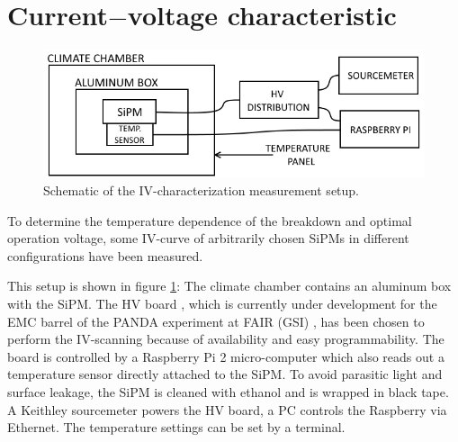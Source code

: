 \section{Current$-$voltage characteristic}
\begin{figure}[b]
	\centering
	\includegraphics[width=0.85\linewidth]{./graphics/ch4/scheme_iv_curves.png}
	\caption{Schematic of the IV-characterization measurement setup.}
	\label{fig:ch4:iv_scheme}
\end{figure}
To determine the temperature dependence of the breakdown and optimal operation voltage, some IV-curve of arbitrarily chosen SiPMs in different configurations have been measured.  \par 
This setup is shown in figure \ref{fig:ch4:iv_scheme}: The climate chamber contains an aluminum box with the SiPM. The HV board \cite{chris}, which is currently under development for the EMC barrel of the PANDA experiment at FAIR (GSI) \cite{panda_emctdr}, has been chosen to perform the IV-scanning because of availability and easy programmability. The board is controlled by a Raspberry Pi 2 micro-computer which also reads out a temperature sensor  directly attached to the SiPM. To avoid parasitic light and surface leakage, the SiPM is cleaned with ethanol and is wrapped in black tape. A Keithley sourcemeter powers the HV board, a PC controls the Raspberry via Ethernet. The temperature settings can be set by a terminal. 

